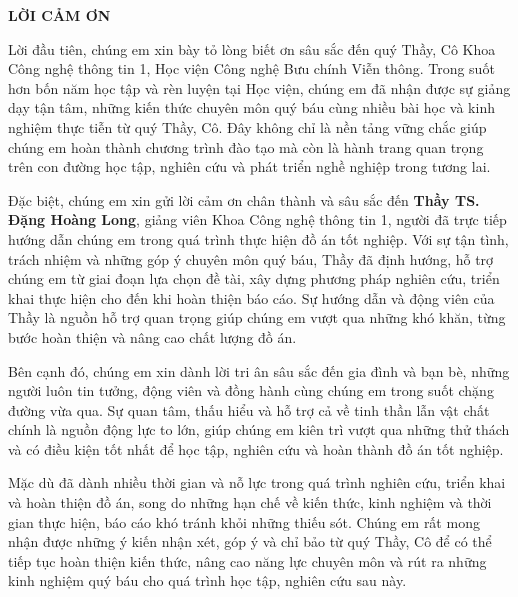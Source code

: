 

\clearpage
\thispagestyle{empty}

\begin{center}
    \textbf{\Large LỜI CẢM ƠN}
\end{center}

\vspace{0.5cm}

Lời đầu tiên, chúng em xin bày tỏ lòng biết ơn sâu sắc đến quý Thầy, Cô Khoa Công nghệ thông tin 1, Học viện Công nghệ Bưu chính Viễn thông. Trong suốt hơn bốn năm học tập và rèn luyện tại Học viện, chúng em đã nhận được sự giảng dạy tận tâm, những kiến thức chuyên môn quý báu cùng nhiều bài học và kinh nghiệm thực tiễn từ quý Thầy, Cô. Đây không chỉ là nền tảng vững chắc giúp chúng em hoàn thành chương trình đào tạo mà còn là hành trang quan trọng trên con đường học tập, nghiên cứu và phát triển nghề nghiệp trong tương lai.

\vspace{0.3cm}

Đặc biệt, chúng em xin gửi lời cảm ơn chân thành và sâu sắc đến \textbf{Thầy TS. Đặng Hoàng Long}, giảng viên Khoa Công nghệ thông tin 1, người đã trực tiếp hướng dẫn chúng em trong quá trình thực hiện đồ án tốt nghiệp. Với sự tận tình, trách nhiệm và những góp ý chuyên môn quý báu, Thầy đã định hướng, hỗ trợ chúng em từ giai đoạn lựa chọn đề tài, xây dựng phương pháp nghiên cứu, triển khai thực hiện cho đến khi hoàn thiện báo cáo. Sự hướng dẫn và động viên của Thầy là nguồn hỗ trợ quan trọng giúp chúng em vượt qua những khó khăn, từng bước hoàn thiện và nâng cao chất lượng đồ án.


Bên cạnh đó, chúng em xin dành lời tri ân sâu sắc đến gia đình và bạn bè, những người luôn tin tưởng, động viên và đồng hành cùng chúng em trong suốt chặng đường vừa qua. Sự quan tâm, thấu hiểu và hỗ trợ cả về tinh thần lẫn vật chất chính là nguồn động lực to lớn, giúp chúng em kiên trì vượt qua những thử thách và có điều kiện tốt nhất để học tập, nghiên cứu và hoàn thành đồ án tốt nghiệp.

\vspace{0.3cm}

Mặc dù đã dành nhiều thời gian và nỗ lực trong quá trình nghiên cứu, triển khai và hoàn thiện đồ án, song do những hạn chế về kiến thức, kinh nghiệm và thời gian thực hiện, báo cáo khó tránh khỏi những thiếu sót. Chúng em rất mong nhận được những ý kiến nhận xét, góp ý và chỉ bảo từ quý Thầy, Cô để có thể tiếp tục hoàn thiện kiến thức, nâng cao năng lực chuyên môn và rút ra những kinh nghiệm quý báu cho quá trình học tập, nghiên cứu sau này.


